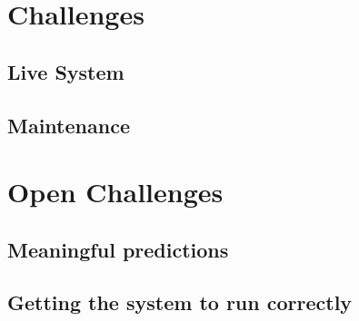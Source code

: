 \documentclass[11pt]{beamer}
\begin{document}
\section{Challenges}
\subsection{Live System}
\begin{frame}
  \frametitle{}
\end{frame}

\subsection{Maintenance}
\begin{frame}
  \frametitle{}
\end{frame}

\section{Open Challenges}
\subsection{Meaningful predictions}
\begin{frame}
  \frametitle{}
\end{frame}

\subsection{Getting the system to run correctly}
\begin{frame}
  \frametitle{}
\end{frame}
\end{document}
